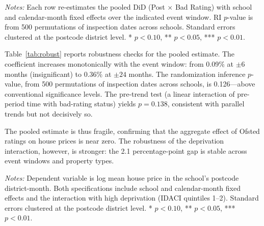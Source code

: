 \documentclass[12pt]{article}
\begin{document}
\begin{table}[H]
\centering
\caption{Robustness: Event Windows and Randomization Inference}
\label{tab:robust}
\begin{threeparttable}
\begin{tablenotes}[flushleft]
\small
\item \textit{Notes:} Each row re-estimates the pooled DiD (Post $\times$ Bad Rating) with school and calendar-month fixed effects over the indicated event window. RI $p$-value is from 500 permutations of inspection dates across schools. Standard errors clustered at the postcode district level. * $p<0.10$, ** $p<0.05$, *** $p<0.01$.
\end{tablenotes}
\end{threeparttable}
\end{table}

Table~\ref{tab:robust} reports robustness checks for the pooled estimate. The coefficient increases monotonically with the event window: from 0.09\% at $\pm 6$ months (insignificant) to 0.36\% at $\pm 24$ months. The randomization inference $p$-value, from 500 permutations of inspection dates across schools, is 0.126---above conventional significance levels. The pre-trend test (a linear interaction of pre-period time with bad-rating status) yields $p = 0.138$, consistent with parallel trends but not decisively so.

The pooled estimate is thus fragile, confirming that the aggregate effect of Ofsted ratings on house prices is near zero. The robustness of the deprivation interaction, however, is stronger: the 2.1 percentage-point gap is stable across event windows and property types.

\begin{table}[H]
\centering
\caption{Heterogeneity by School Phase}
\label{tab:phase}
\begin{threeparttable}
\begin{tablenotes}[flushleft]
\small
\item \textit{Notes:} Dependent variable is log mean house price in the school's postcode district-month. Both specifications include school and calendar-month fixed effects and the interaction with high deprivation (IDACI quintiles 1--2). Standard errors clustered at the postcode district level. * $p<0.10$, ** $p<0.05$, *** $p<0.01$.
\end{tablenotes}
\end{threeparttable}
\end{table}
\end{document}
